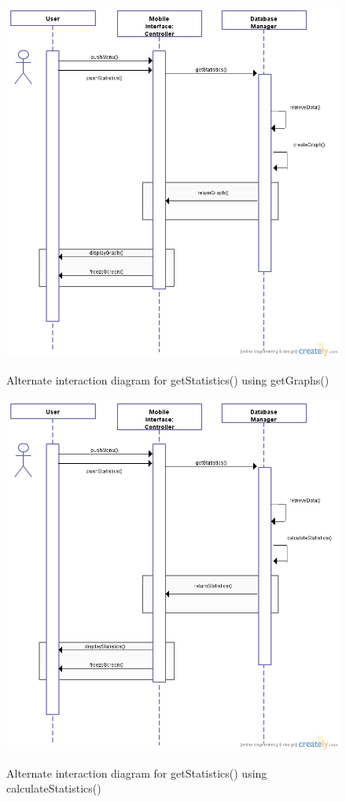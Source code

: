 \documentclass[letterpaper,english, 12pt]{scrreprt}
\begin{document}
\begin{figure}[H]
	\includegraphics[scale=.30]{img/Interaction_Diagrams/getStatisticsAlternateGraphs.png}\\
	\caption {Alternate interaction diagram for getStatistics() using getGraphs()} 
\end{figure}

\begin{figure}[H]
	\centering
	\includegraphics[scale=.30]{img/Interaction_Diagrams/getStatisticsAlternateNumbers.png}\\
	\caption {Alternate interaction diagram for getStatistics() using calculateStatistics()} 
\end{figure}
\end{document}
